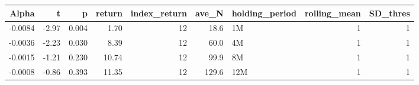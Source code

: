 \begin{table}[ht]
\centering
\begin{tabular}{rrrrrrlrr}
  \hline
Alpha & t & p & return & index\_return & ave\_N & holding\_period & rolling\_mean & SD\_thres \\ 
  \hline
-0.0084 & -2.97 & 0.004 & 1.70 & 12 & 18.6 & 1M &  1 &  1 \\ 
  -0.0036 & -2.23 & 0.030 & 8.39 & 12 & 60.0 & 4M &  1 &  1 \\ 
  -0.0015 & -1.21 & 0.230 & 10.74 & 12 & 99.9 & 8M &  1 &  1 \\ 
  -0.0008 & -0.86 & 0.393 & 11.35 & 12 & 129.6 & 12M &  1 &  1 \\ 
   \hline
\end{tabular}
\end{table}

